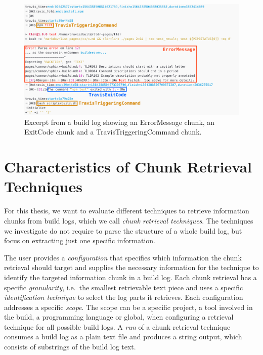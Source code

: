 \documentclass[\myrootdir/main.tex]{subfiles}
\begin{document}
\begin{figure}[htbp]
	\centering
	\includegraphics[width=\textwidth, clip]{img/log32.png}
	\caption{Excerpt from a build log showing an ErrorMessage chunk, an ExitCode chunk and a TravisTriggeringCommand chunk.}
	\label{fig:log-3}
\end{figure}


\section{Characteristics of Chunk Retrieval Techniques}
\label{sec:blirt}
For this thesis, we want to evaluate different techniques to retrieve information chunks from build logs, which we call \emph{chunk retrieval techniques}.
The techniques we investigate do not require to parse the structure of a whole build log, but focus on extracting just one specific information.

The user provides a \textit{configuration} that specifies which information the chunk retrieval should target and supplies the necessary information for the technique to identify the targeted information chunk in a build log.
Each chunk retrieval has a specific \textit{granularity}, i.e.\ the smallest retrievable text piece and uses a specific \textit{identification technique} to select the log parts it retrieves.
Each configuration addresses a specific \textit{scope}.
The scope can be a specific project, a tool involved in the build, a programming language or global, when configuring a retrieval technique for all possible build logs.
A \emph{run} of a chunk retrieval technique consumes a build log as a plain text file and produces a string output, which consists of substrings of the build log text.
\end{document}
